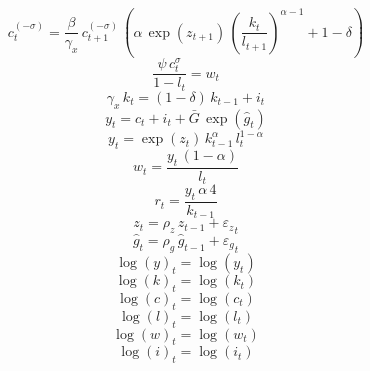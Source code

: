\begin{dmath}
{{c}}_{t}^{\left(-{{\sigma}}\right)}=\frac{{{\beta}}}{{{\gamma_x}}}\, {{c}}_{t+1}^{\left(-{{\sigma}}\right)}\, \left({{\alpha}}\, \exp\left({{z}}_{t+1}\right)\, \left(\frac{{{k}}_{t}}{{{l}}_{t+1}}\right)^{{{\alpha}}-1}+1-{{\delta}}\right)
\end{dmath}
\begin{dmath}
\frac{{{\psi}}\, {{c}}_{t}^{{{\sigma}}}}{1-{{l}}_{t}}={{w}}_{t}
\end{dmath}
\begin{dmath}
{{\gamma_x}}\, {{k}}_{t}=\left(1-{{\delta}}\right)\, {{k}}_{t-1}+{{i}}_{t}
\end{dmath}
\begin{dmath}
{{y}}_{t}={{c}}_{t}+{{i}}_{t}+{{\bar G}}\, \exp\left({{\hat g}}_{t}\right)
\end{dmath}
\begin{dmath}
{{y}}_{t}=\exp\left({{z}}_{t}\right)\, {{k}}_{t-1}^{{{\alpha}}}\, {{l}}_{t}^{1-{{\alpha}}}
\end{dmath}
\begin{dmath}
{{w}}_{t}=\frac{{{y}}_{t}\, \left(1-{{\alpha}}\right)}{{{l}}_{t}}
\end{dmath}
\begin{dmath}
{{r}}_{t}=\frac{{{y}}_{t}\, {{\alpha}}\, 4}{{{k}}_{t-1}}
\end{dmath}
\begin{dmath}
{{z}}_{t}={{\rho_z}}\, {{z}}_{t-1}+{{\varepsilon_z}}_{t}
\end{dmath}
\begin{dmath}
{{\hat g}}_{t}={{\rho_g}}\, {{\hat g}}_{t-1}+{{\varepsilon_g}}_{t}
\end{dmath}
\begin{dmath}
{{\log(y)}}_{t}=\log\left({{y}}_{t}\right)
\end{dmath}
\begin{dmath}
{{\log(k)}}_{t}=\log\left({{k}}_{t}\right)
\end{dmath}
\begin{dmath}
{{\log(c)}}_{t}=\log\left({{c}}_{t}\right)
\end{dmath}
\begin{dmath}
{{\log(l)}}_{t}=\log\left({{l}}_{t}\right)
\end{dmath}
\begin{dmath}
{{\log(w)}}_{t}=\log\left({{w}}_{t}\right)
\end{dmath}
\begin{dmath}
{{\log(i)}}_{t}=\log\left({{i}}_{t}\right)
\end{dmath}
